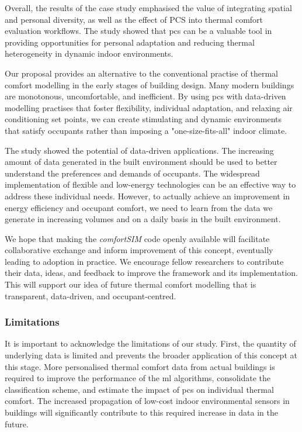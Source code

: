 Overall, the results of the case study emphasised the value of integrating spatial and personal diversity, as well as the effect of PCS into thermal comfort evaluation workflows. The study showed that \gls{pcs} can be a valuable tool in providing opportunities for personal adaptation and reducing thermal heterogeneity in dynamic indoor environments.

Our proposal provides an alternative to the conventional practise of thermal comfort modelling in the early stages of building design. Many modern buildings are monotonous, uncomfortable, and inefficient. By using  \gls{pcs} with data-driven modelling practises that foster flexibility, individual adaptation, and relaxing air conditioning set points, we can create stimulating and dynamic environments that satisfy occupants rather than imposing a "one-size-fits-all" indoor climate.

The study showed the potential of data-driven applications. The increasing amount of data generated in the built environment should be used to better understand the preferences and demands of occupants. The widespread implementation of flexible and low-energy technologies can be an effective way to address these individual needs. However, to actually achieve an improvement in energy efficiency and occupant comfort, we need to learn from the data we generate in increasing volumes and on a daily basis in the built environment.

We hope that making the \textit{comfortSIM} code openly available will facilitate collaborative exchange and inform improvement of this concept, eventually leading to adoption in practice. We encourage fellow researchers to contribute their data, ideas, and feedback to improve the framework and its implementation. This will support our idea of future thermal comfort modelling that is transparent, data-driven, and occupant-centred.

\subsubsection*{Limitations}

It is important to acknowledge the limitations of our study. First, the quantity of underlying data is limited and prevents the broader application of this concept at this stage. More personalised thermal comfort data from actual buildings is required to improve the performance of the \gls{ml} algorithms, consolidate the classification scheme, and estimate the impact of \gls{pcs} on individual thermal comfort. The increased propagation of low-cost indoor environmental sensors in buildings will significantly contribute to this required increase in data in the future.

